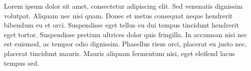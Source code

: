 \documentclass{timmbrief}
\begin{document}
\begin{letter}

Lorem ipsum dolor sit amet, consectetur adipiscing elit. Sed venenatis dignissim volutpat. Aliquam nec nisi quam. Donec et metus consequat neque hendrerit bibendum eu et orci. Suspendisse eget tellus eu dui tempus tincidunt hendrerit eget tortor. Suspendisse pretium ultrices dolor quis fringilla. In accumsan nisi nec est euismod, ac tempor odio dignissim. Phasellus risus orci, placerat eu justo nec, placerat tincidunt mauris. Mauris aliquam fermentum nisi, eget eleifend lacus tempus sed.
\end{letter}



\signed
\end{document}
